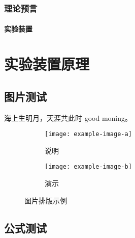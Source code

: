 \subsection{理论预言}%



\zhlipsum[3]

\subsubsection{实验装置}%

\zhlipsum[4]


\chapter{实验装置原理}%


\section{图片测试}

海上生明月，天涯共此时 good moning。
\zhlipsum[1]


\begin{figure}[h!]
	\centering
	\begin{subfigure}{0.4\linewidth}
		\centering
		\texttt{[image: example-image-a]}
		\caption{说明}\label{}
	\end{subfigure}
	\hfil
	\begin{subfigure}{0.4\linewidth}
		\centering
		\texttt{[image: example-image-b]}
		\caption{演示}\label{}
	\end{subfigure}
	\caption{图片排版示例}
\end{figure}

\section{公式测试}

